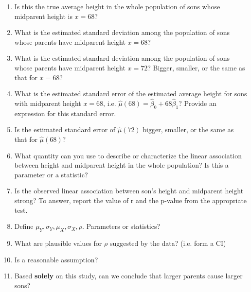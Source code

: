\documentclass{report}
\begin{document}
\begin{enumerate}
\item Is this the true average height in the whole population of sons whose midparent height is $x=68$?
\item What is the estimated standard deviation among the population of sons whose parents have midparent height $x=68$?  
\item What is the estimated standard deviation among the population of sons whose parents have midparent height $x=72$?  
Bigger, smaller, or the same as that for $x=68$?
\item What is the estimated standard error of the estimated average height for sons with midparent height $x=68$, i.e. $\hat\mu(68)=\hat\beta_0 + 68 \hat\beta_1$?
Provide an expression for this standard error.
\item Is the estimated standard error of $\hat\mu(72)$ bigger, smaller, or the same as that for $\hat\mu(68)$?
\item What quantity can you use to describe or characterize the linear association between height and midparent height in the whole population?
Is this a parameter or a statistic?
\item Is the observed linear association between son's height and midparent height strong?  To answer, report the value of r and the p-value from the appropriate test.
\item Define $\mu_Y,\sigma_Y,\mu_X,\sigma_X,\rho$. Parameters or statistics?
\item What are plausible values for $\rho$ suggested by the data? (i.e. form a CI)
\item Is  a reasonable assumption?
\item Based \textbf{solely} on this study, can we conclude that larger parents cause larger sons?
\end{enumerate}
\end{document}
